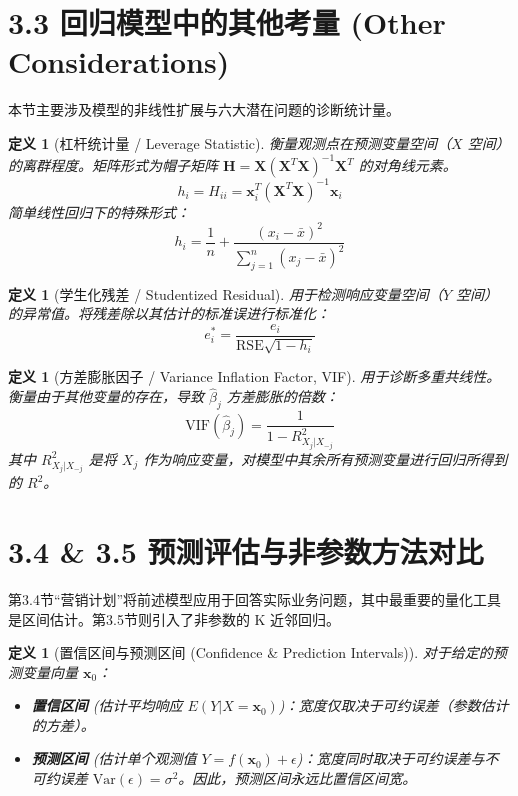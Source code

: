 \documentclass[UTF8]{ctexart}
\newtheorem{definition}[theorem]{定义}
\numberwithin{equation}{section}
\newcommand{\Var}{\text{Var}}
\newcommand{\RSE}{\text{RSE}}
\begin{document}
\section{3.3 回归模型中的其他考量 (Other Considerations)}
本节主要涉及模型的非线性扩展与六大潜在问题的诊断统计量。

\begin{definition}[杠杆统计量 / Leverage Statistic]
衡量观测点在预测变量空间（$X$ 空间）的离群程度。矩阵形式为帽子矩阵 $\mathbf{H} = \mathbf{X}(\mathbf{X}^T\mathbf{X})^{-1}\mathbf{X}^T$ 的对角线元素。
\begin{equation}
h_i = H_{ii} = \mathbf{x}_i^T (\mathbf{X}^T\mathbf{X})^{-1} \mathbf{x}_i
\end{equation}
简单线性回归下的特殊形式：
\begin{equation}
h_i = \frac{1}{n} + \frac{(x_i - \bar{x})^2}{\sum_{j=1}^n (x_j - \bar{x})^2}
\end{equation}
\end{definition}

\begin{definition}[学生化残差 / Studentized Residual]
用于检测响应变量空间（$Y$ 空间）的异常值。将残差除以其估计的标准误进行标准化：
\begin{equation}
e_i^* = \frac{e_i}{\RSE \sqrt{1 - h_i}}
\end{equation}
\end{definition}

\begin{definition}[方差膨胀因子 / Variance Inflation Factor, VIF]
用于诊断多重共线性。衡量由于其他变量的存在，导致 $\hat{\beta}_j$ 方差膨胀的倍数：
\begin{equation}
\text{VIF}(\hat{\beta}_j) = \frac{1}{1 - R_{X_j | X_{-j}}^2}
\end{equation}
其中 $R_{X_j | X_{-j}}^2$ 是将 $X_j$ 作为响应变量，对模型中其余所有预测变量进行回归所得到的 $R^2$。
\end{definition}

\section{3.4 \& 3.5 预测评估与非参数方法对比}
第3.4节“营销计划”将前述模型应用于回答实际业务问题，其中最重要的量化工具是区间估计。第3.5节则引入了非参数的 K 近邻回归。

\begin{definition}[置信区间与预测区间 (Confidence \& Prediction Intervals)]
对于给定的预测变量向量 $\mathbf{x}_0$：
\begin{itemize}
    \item \textbf{置信区间} (估计平均响应 $E(Y|X=\mathbf{x}_0)$)：宽度仅取决于可约误差（参数估计的方差）。
    \item \textbf{预测区间} (估计单个观测值 $Y = f(\mathbf{x}_0) + \epsilon$)：宽度同时取决于可约误差与不可约误差 $\Var(\epsilon) = \sigma^2$。因此，预测区间永远比置信区间宽。
\end{itemize}
\end{definition}
\end{document}
